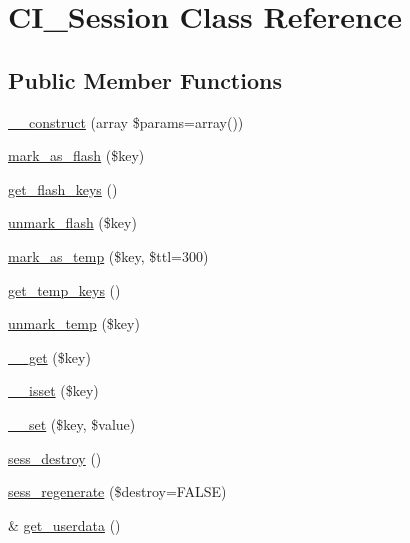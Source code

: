 \hypertarget{class_c_i___session}{}\section{C\+I\+\_\+\+Session Class Reference}
\label{class_c_i___session}
\subsection*{Public Member Functions}
\begin{DoxyCompactItemize}
\item 
\mbox{\hyperlink{class_c_i___session_a85ac5b7f54ad67ec6b5b9dc282717602}{\+\_\+\+\_\+construct}} (array \$params=array())
\item 
\mbox{\hyperlink{class_c_i___session_a81fdbc2498fc26532aee037f03dbaf55}{mark\+\_\+as\+\_\+flash}} (\$key)
\item 
\mbox{\hyperlink{class_c_i___session_a996e70387750cdc480712c1585743d8d}{get\+\_\+flash\+\_\+keys}} ()
\item 
\mbox{\hyperlink{class_c_i___session_a8e89303bfdff75a20528986c2bcdba86}{unmark\+\_\+flash}} (\$key)
\item 
\mbox{\hyperlink{class_c_i___session_ab55f3c6806c359d98edd6138ef33ecf0}{mark\+\_\+as\+\_\+temp}} (\$key, \$ttl=300)
\item 
\mbox{\hyperlink{class_c_i___session_a4fd9f48ff9bcf093778529cb7389eddb}{get\+\_\+temp\+\_\+keys}} ()
\item 
\mbox{\hyperlink{class_c_i___session_a602eaf2b4a6936ed9bb8750892fac551}{unmark\+\_\+temp}} (\$key)
\item 
\mbox{\hyperlink{class_c_i___session_a4537dad3b44254124991341cc91b28fb}{\+\_\+\+\_\+get}} (\$key)
\item 
\mbox{\hyperlink{class_c_i___session_ae858fed7cd2822fbceac154138b68baa}{\+\_\+\+\_\+isset}} (\$key)
\item 
\mbox{\hyperlink{class_c_i___session_a79b36d71c6f1d4f9e6c4c3e34c081456}{\+\_\+\+\_\+set}} (\$key, \$value)
\item 
\mbox{\hyperlink{class_c_i___session_a9451d1625c402b8d712aedaa5ebc752d}{sess\+\_\+destroy}} ()
\item 
\mbox{\hyperlink{class_c_i___session_afec342ef8722ac0ce4a672e6cfad60c0}{sess\+\_\+regenerate}} (\$destroy=F\+A\+L\+SE)
\item 
\& \mbox{\hyperlink{class_c_i___session_a85456fcd9f556e20767051fc33762607}{get\+\_\+userdata}} ()
\item 

\end{DoxyCompactItemize}
